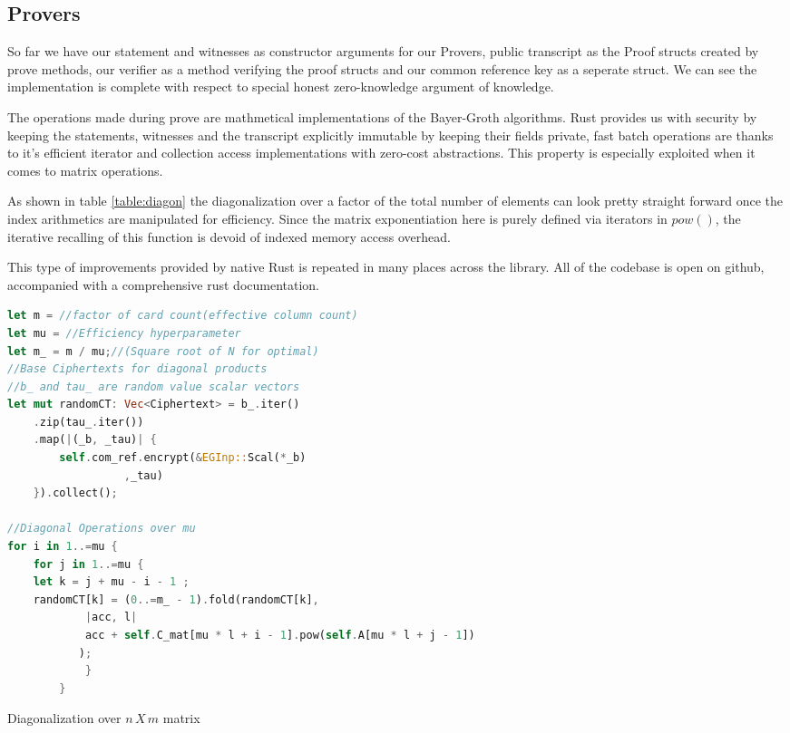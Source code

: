 \documentclass[12pt,a4paper]{report}
\begin{document}
\subsection*{Provers}
So far we have our statement and witnesses as constructor arguments for our Provers, public transcript as the Proof structs created by prove methods, our verifier as a method verifying the proof structs and our common reference key as a seperate struct. We can see the implementation is complete with respect to special honest zero-knowledge argument of knowledge.\par
The operations made during prove are  mathmetical implementations of the Bayer-Groth algorithms. 
Rust provides us with security by keeping the statements, witnesses and the transcript explicitly immutable by keeping their fields private, 
fast batch operations are thanks to it's efficient iterator and collection access implementations with zero-cost abstractions.
This property is especially exploited when it comes to matrix operations.\par
As shown in table \ref{table:diagon} the diagonalization over a factor of the total number of elements
can look pretty straight forward once the index arithmetics are manipulated for efficiency.
Since the matrix exponentiation here is purely defined via iterators in $pow()$, 
the iterative recalling of this function is devoid of indexed memory access overhead.\par
This type of improvements provided by native Rust is repeated in many places across the library.
All of the codebase is open on github\cite{repo}, accompanied with a comprehensive rust documentation.

\begin{table}
\begin{lstlisting}[language=Rust]
let m = //factor of card count(effective column count)
let mu = //Efficiency hyperparameter
let m_ = m / mu;//(Square root of N for optimal)
//Base Ciphertexts for diagonal products
//b_ and tau_ are random value scalar vectors
let mut randomCT: Vec<Ciphertext> = b_.iter()
	.zip(tau_.iter())
	.map(|(_b, _tau)| {
	    self.com_ref.encrypt(&EGInp::Scal(*_b) 
				  ,_tau)
	}).collect();

//Diagonal Operations over mu
for i in 1..=mu {
    for j in 1..=mu {
	let k = j + mu - i - 1 ;
	randomCT[k] = (0..=m_ - 1).fold(randomCT[k],
		    |acc, l|
			acc + self.C_mat[mu * l + i - 1].pow(self.A[mu * l + j - 1])
		   );
            }
        }
\end{lstlisting}
\caption{Diagonalization over $n\,X\,m$ matrix}
\label{table:diagon}
\end{table}
\end{document}
